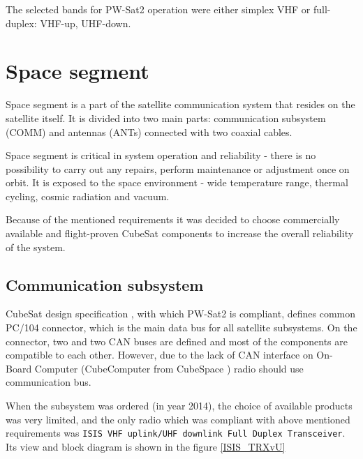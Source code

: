 The selected bands for PW-Sat2 operation were either simplex VHF or full-duplex: VHF-up, UHF-down.


\chapter{Space segment}
Space segment is a part of the satellite communication system that resides on the satellite itself. It is divided into two main parts: communication subsystem (COMM) and antennas (ANTs) connected with two coaxial cables.

Space segment is critical in system operation and reliability - there is no possibility to carry out any repairs, perform maintenance or adjustment once on orbit. It is exposed to the space environment - wide temperature range, thermal cycling, cosmic radiation and vacuum.

Because of the mentioned requirements it was decided to choose commercially available and flight-proven CubeSat components to increase the overall reliability of the system.

\section{Communication subsystem}
CubeSat design specification \cite{cubesat_spec}, with which PW-Sat2 is compliant, defines common PC/104 connector, which is the main data bus for all satellite subsystems. On the connector, two \iic and two CAN buses are defined and most of the components are compatible to each other. However, due to the lack of CAN interface on On-Board Computer (CubeComputer from CubeSpace \cite{cubespace_website}) radio should use \iic communication bus.

When the subsystem was ordered (in year \si{2014}), the choice of available products was very limited, and the only radio which was compliant with above mentioned requirements was \texttt{ISIS VHF uplink/UHF downlink Full Duplex Transceiver}. Its view and block diagram is shown in the figure \ref{ISIS_TRXvU}

